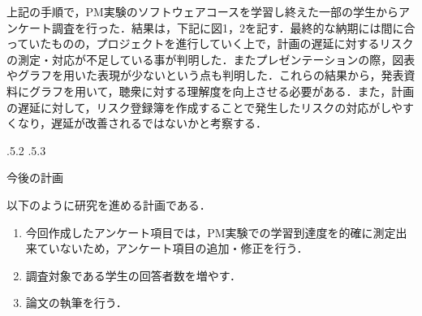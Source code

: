 \documentclass[uplatex]{jsarticle}
\makeatletter
\renewcommand{\section}{%
    \if@slide\clearpage\fi
    \@startsection{section}{1}{\z@}%
    {\Cvs \@plus.5\Cdp \@minus.2\Cdp}%
    {.5\Cvs \@plus.3\Cdp}%
    {\normalfont\raggedright}}
\makeatother
\begin{document}
上記の手順で，PM実験のソフトウェアコースを学習し終えた一部の学生からアンケート調査を行った．結果は，下記に図1，2を記す．最終的な納期には間に合っていたものの，プロジェクトを進行していく上で，計画の遅延に対するリスクの測定・対応が不足している事が判明した．またプレゼンテーションの際，図表やグラフを用いた表現が少ないという点も判明した．これらの結果から，発表資料にグラフを用いて，聴衆に対する理解度を向上させる必要がある．また，計画の遅延に対して，リスク登録簿を作成することで発生したリスクの対応がしやすくなり，遅延が改善されるではないかと考察する．




\section{今後の計画}

以下のように研究を進める計画である．

\begin{enumerate}
\item 今回作成したアンケート項目では，PM実験での学習到達度を的確に測定出来ていないため，アンケート項目の追加・修正を行う．
\item 調査対象である学生の回答者数を増やす．
\item 論文の執筆を行う．
\end{enumerate}
\end{document}
